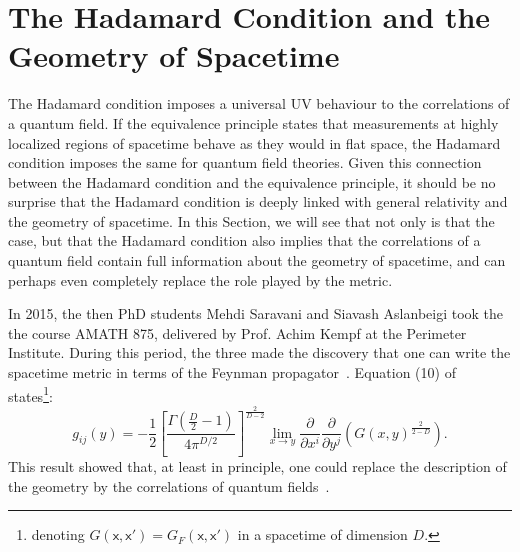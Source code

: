 \documentclass[letterpaper,12pt,titlepage,oneside,final]{book}
\newcommand{\mf}{\mathsf}%
\newcommand{\trr}[1]{\textcolor{red}{#1}}
\begin{document}
\section{The Hadamard Condition and the Geometry of Spacetime}\label{sec:geometry}



The Hadamard condition imposes a universal UV behaviour to the correlations of a quantum field. If the equivalence principle states that measurements at highly localized regions of spacetime behave as they would in flat space, the Hadamard condition imposes the same for quantum field theories. Given this connection between the Hadamard condition and the equivalence principle, it should be no surprise that the Hadamard condition is deeply linked with general relativity and the geometry of spacetime. In this Section, we will see that not only is that the case, but that the Hadamard condition also implies that the correlations of a quantum field contain full information about the geometry of spacetime, and can perhaps even completely replace the role played by the metric.




In 2015, the then PhD students Mehdi Saravani and Siavash Aslanbeigi took the the course AMATH 875, delivered by Prof. Achim Kempf at the Perimeter Institute. During this period, the three made the discovery that one can write the spacetime metric in terms of the Feynman propagator~\cite{achim}. Equation (10) of~\cite{achim} states\footnote{denoting $G(\mf x, \mf x') = G_F(\mf x, \mf x')$ in a spacetime of dimension $D$.}:
\begin{equation}\label{eq:saravani}
g_{ij}(y) = -\frac{1}{2} \left[ \frac{\Gamma\left(\frac{D}{2} - 1\right)}{4\pi^{D/2}} \right]^{\frac{2}{D-2}} 
\lim_{x \to y} \frac{\partial}{\partial x^i} \frac{\partial}{\partial y^j} 
\left( G(x, y)^{\frac{2}{2 - D}} \right).
\end{equation}
This result showed that, at least in principle, one could replace the description of the geometry by the correlations of quantum fields~\cite{achim2}.
\end{document}
